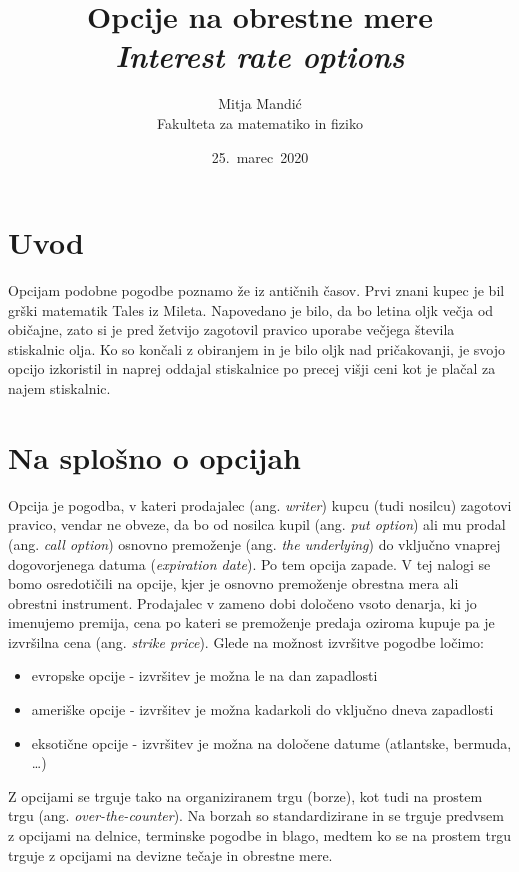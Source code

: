 \documentclass[a4paper]{article}
\title{Opcije na obrestne mere\\
    \textit{Interest rate options}}
\author{Mitja Mandić \\ Fakulteta za matematiko in fiziko}
\date{25.\ marec\ 2020}
\begin{document}
\maketitle

\pagebreak

\begin{abstract}

\end{abstract}
\pagebreak

\section{Uvod}
Opcijam podobne pogodbe poznamo že iz antičnih časov. Prvi znani kupec je bil grški matematik Tales iz Mileta.
Napovedano je bilo, da bo letina oljk večja od običajne, zato si je pred žetvijo zagotovil pravico uporabe večjega
števila stiskalnic olja. Ko so končali z obiranjem in je bilo oljk nad pričakovanji, je svojo opcijo izkoristil in naprej oddajal
stiskalnice po precej višji ceni kot je plačal za najem stiskalnic.

\section{Na splošno o opcijah}

Opcija je pogodba, v kateri prodajalec (ang. \textit{writer}) kupcu (tudi nosilcu) zagotovi pravico, 
vendar ne obveze, da bo od nosilca kupil (ang. \textit{put option})
ali mu prodal (ang. \textit{call option}) osnovno premoženje (ang. \textit{the underlying}) do 
vključno vnaprej dogovorjenega datuma (\textit{expiration date}).
Po tem opcija zapade.  V tej nalogi se bomo osredotičili na opcije, kjer je
osnovno premoženje obrestna mera ali obrestni instrument. Prodajalec v zameno dobi določeno vsoto denarja, ki jo imenujemo premija, 
cena po kateri se premoženje predaja oziroma kupuje pa je izvršilna cena (ang. \textit{strike price}).
Glede na možnost izvršitve pogodbe ločimo:
\begin{itemize}
    \item evropske opcije - izvršitev je možna le na dan zapadlosti
    \item ameriške opcije - izvršitev je možna kadarkoli do vključno dneva zapadlosti
    \item eksotične opcije - izvršitev je možna na določene datume (atlantske, bermuda, \ldots)
\end{itemize} \par
Z opcijami se trguje tako na organiziranem trgu (borze), kot tudi na prostem trgu (ang. \textit{over-the-counter}). Na borzah so
standardizirane in se trguje predvsem z opcijami na delnice, terminske pogodbe in blago, medtem ko se na prostem trgu trguje z opcijami
na devizne tečaje in obrestne mere.
\end{document}

